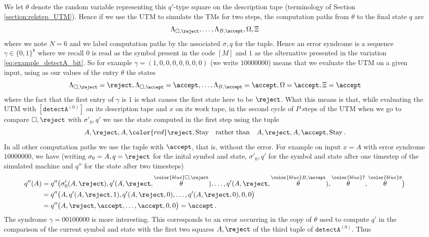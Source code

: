 \documentclass[english,letter paper,12pt,reqno]{article}
\theoremstyle{definition}
\newcommand{\detectA}{\texttt{detectA}}
\begin{document}
We let $\theta$ denote the random variable representing this $q'$-type square on the description tape (terminology of Section \ref{section:relstep_UTM}). Hence if we use the UTM to simulate the TMs for two steps, the computation paths from $\theta$ to the final state $q$ are
\[
\Lambda_{\Box, \reject}, \ldots, \Lambda_{B, \accept}, \Omega, \Xi
\]
where we note $N = 6$ and we label computation paths by the associated $\sigma,q$ for the tuple. Hence an error syndrome is a sequence $\gamma \in \{0,1\}^8$ where we recall $0$ is read as the symbol present in the code $[M]$ and $1$ as the alternative presented in the variation \eqref{eq:example_detectA_bit}. So for example $\gamma = (1,0,0,0,0,0,0,0)$ (we write $10000000$) means that we evaluate the UTM on a given input, using as our values of the entry $\theta$ the states
\[
\Lambda_{\Box, \reject} = \reject, \Lambda_{\Box, \accept} = \accept, \ldots, \Lambda_{B, \accept} = \accept, \Omega = \accept, \Xi = \accept
\]
where the fact that the first entry of $\gamma$ is $1$ is what causes the first state here to be $\reject$. What this means is that, while evaluating the UTM with $[\detectA^{(0)}]$ on its description tape and $x$ on its work tape, in the second cycle of $P$ steps of the UTM when we go to compare $\Box, \reject$ with $\sigma'_0, q'$ we use the state computed in the first step using the tuple
\[
A, \reject, A, {\color{red} \reject }, \text{Stay} \quad \text{rather than} \quad A, \reject, A, \accept, \text{Stay}\,.
\]
In all other computation paths we use the tuple with $\accept$, that is, without the error. For example on input $x = A$ with error syndrome $10000000$, we have (writing $\sigma_0 = A, q = \reject$ for the inital symbol and state, $\sigma'_0, q'$ for the symbol and state after one timestep of the simulated machine and $q''$ for the state after two timesteps)
\begin{align*}
q''(A) &= q''\big(\sigma'_0(A, \reject), q'(A, \reject, \overset{{\color{blue} \Box,\reject}}{\theta}), \ldots, q'(A, \reject, \overset{{\color{blue} B,\accept}}{\theta}), \overset{{\color{blue} 7}}{\theta}, \overset{{\color{blue} 8}}{\theta}\big)\\
&= q''\big( A, q'(A, \reject, 1), q'(A, \reject, 0), \ldots, q'(A, \reject, 0), 0, 0\big)\\
&= q''\big( A, \reject, \accept, \ldots, \accept, 0, 0 \big) = \accept\,.
\end{align*}
The syndrome $\gamma = 00100000$ is more interesting. This corresponds to an error occurring in the copy of $\theta$ used to compute $q'$ in the comparison of the current symbol and state with the first two squares $A, \reject$ of the third tuple of $\detectA^{(0)}$. Thus
\end{document}

